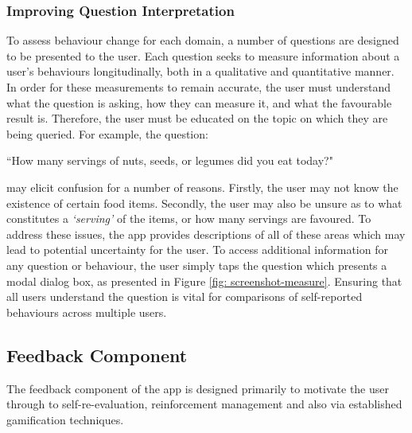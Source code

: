\subsubsection{Improving Question Interpretation}
To assess behaviour change for each domain, a number of questions are designed to be presented to the user. Each question seeks to measure information about a user's behaviours longitudinally, both in a qualitative and quantitative manner. In order for these measurements to remain accurate, the user must understand what the question is asking, how they can measure it, and what the favourable result is. Therefore, the user must be educated on the topic on which they are being queried.
For example, the question:
\begin{displayquote}
``How many servings of nuts, seeds, or legumes did you eat today?"
\end{displayquote}
may elicit confusion for a number of reasons. Firstly, the user may not know the existence of certain food items. Secondly, the user may also be unsure as to what constitutes a \textit{`serving'} of the items, or how many servings are favoured.
To address these issues, the app provides descriptions of all of these areas which may lead to potential uncertainty for the user. To access additional information for any question or behaviour, the user simply taps the question which presents a modal dialog box, as presented in Figure \ref{fig: screenshot-measure}. Ensuring that all users understand the question is vital for comparisons of self-reported behaviours across multiple users.

\subsection{Feedback Component}
The feedback component of the app is designed primarily to motivate the user through to self-re-evaluation, reinforcement management and also via established gamification techniques.

